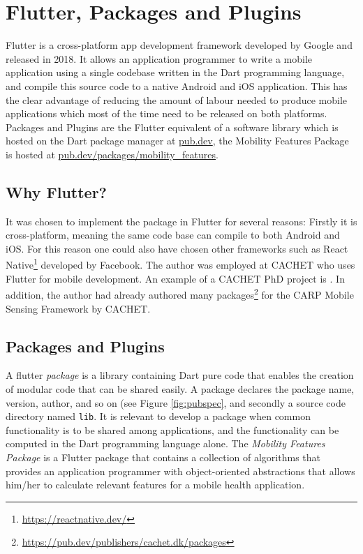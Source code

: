 \section{Flutter, Packages and Plugins}
Flutter is a cross-platform app development framework developed by Google and released in 2018. It allows an application programmer to write a mobile application using a single codebase written in the Dart programming language, and compile this source code to a native Android and iOS application. This has the clear advantage of reducing the amount of labour needed to produce mobile applications which most of the time need to be released on both platforms. Packages and Plugins are the Flutter equivalent of a software library which is hosted on the Dart package manager at \url{pub.dev}, the Mobility Features Package is hosted at \url{pub.dev/packages/mobility_features}. 

\subsection{Why Flutter?}
It was chosen to implement the package in Flutter for several reasons: Firstly it is cross-platform, meaning the same code base can compile to both Android and iOS. For this reason one could also have chosen other frameworks such as React Native\footnote{\url{https://reactnative.dev/}} developed by Facebook. The author was employed at CACHET who uses Flutter for mobile development. An example of a CACHET PhD project is \cite{mubs-rohani}. In addition, the author had already authored many packages\footnote{\url{https://pub.dev/publishers/cachet.dk/packages}} for the CARP Mobile Sensing Framework by CACHET.

\subsection{Packages and Plugins}
A flutter \textit{package} is a library containing Dart pure code that enables the creation of modular code that can be shared easily. A package declares the package name, version, author, and so on (see Figure \ref{fig:pubspec}, and secondly a source code directory named \verb|lib|. It is relevant to develop a package when common functionality is to be shared among applications, and the functionality can be computed in the Dart programming language alone. The \textit{Mobility Features Package} is a Flutter package that contains a collection of algorithms that provides an application programmer with object-oriented abstractions that allows him/her to calculate relevant features for a mobile health application. 


